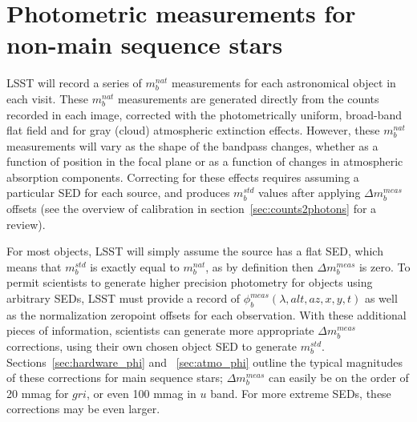 \documentclass[12pt,preprint]{aastex}
\begin{document}
%  
%


\section{Photometric measurements for non-main sequence stars}
\label{sec:photo_better}

LSST will record a series of $m_b^{nat}$ measurements for each
astronomical object in each visit. These $m_b^{nat}$ measurements are
generated directly from the counts recorded in each image, corrected
with the photometrically uniform, broad-band flat field and for gray
(cloud) atmospheric extinction effects. However, these $m_b^{nat}$
measurements will vary as the shape of the bandpass changes, whether
as a function of position in the focal plane or as a function of
changes in atmospheric absorption components. Correcting for these
effects requires assuming a particular SED for each source, and
produces $m_b^{std}$ values after applying $\Delta m_b^{meas}$ offsets
(see the overview of calibration in section~\ref{sec:counts2photons}
for a review).

For most objects, LSST will simply assume the source has a flat SED,
which means that $m_b^{std}$ is exactly equal to $m_b^{nat}$, as by
definition then $\Delta m_b^{meas}$ is zero. To permit scientists to
generate higher precision photometry for objects using arbitrary SEDs,
LSST must provide a record of $\phi_b^{meas}(\lambda,alt,az,x,y,t)$ as
well as the normalization zeropoint offsets for each observation. With
these additional pieces of information, scientists can generate more
appropriate $\Delta m_b^{meas}$ corrections, using their own chosen
object SED to generate $m_b^{std}$. Sections~\ref{sec:hardware_phi}
and ~\ref{sec:atmo_phi} outline the typical magnitudes of these
corrections for main sequence stars; $\Delta m_b^{meas}$ can easily be
on the order of 20 mmag for $gri$, or even 100 mmag in $u$ band. For
more extreme SEDs, these corrections may be even larger.
\end{document}
